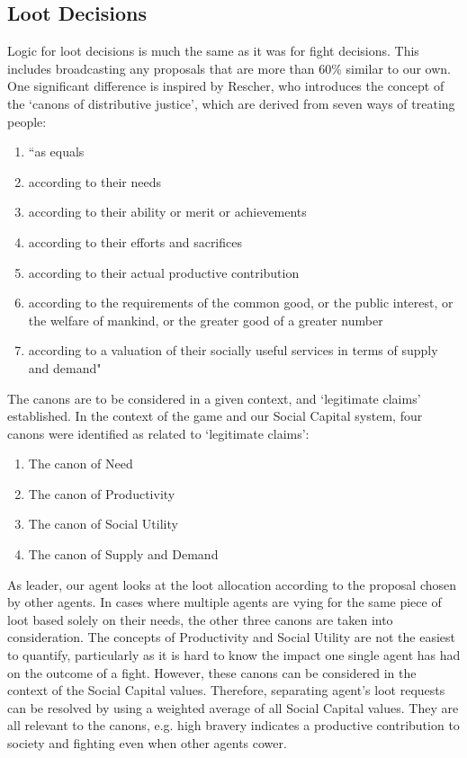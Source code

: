 \subsection{Loot Decisions}

Logic for loot decisions is much the same as it was for fight decisions. This includes broadcasting any proposals that are more than 60\% similar to our own. One significant difference is inspired by Rescher, who introduces the concept of the `canons of distributive justice', which are derived from seven ways of treating people:

\begin{enumerate}
    \item ``as equals
    \item according to their needs
    \item according to their ability or merit or achievements
    \item according to their efforts and sacrifices
    \item according to their actual productive contribution
    \item according to the requirements of the common good, or the public interest, or the welfare of mankind, or the greater good of a greater number
    \item according to a valuation of their socially useful services in terms of supply and demand" \cite{rescher1966}
\end{enumerate}

The canons are to be considered in a given context, and `legitimate claims' established. In the context of the game and our Social Capital system, four canons were identified as related to `legitimate claims':

\begin{enumerate}
    \item The canon of Need
    \item The canon of Productivity
    \item The canon of Social Utility
    \item The canon of Supply and Demand
\end{enumerate}

As leader, our agent looks at the loot allocation according to the proposal chosen by other agents. In cases where multiple agents are vying for the same piece of loot based solely on their needs, the other three canons are taken into consideration. The concepts of Productivity and Social Utility are not the easiest to quantify, particularly as it is hard to know the impact one single agent has had on the outcome of a fight. However, these canons can be considered in the context of the Social Capital values. Therefore, separating agent's loot requests can be resolved by using a weighted average of all Social Capital values. They are all relevant to the canons, e.g. high bravery indicates a productive contribution to society and fighting even when other agents cower.

